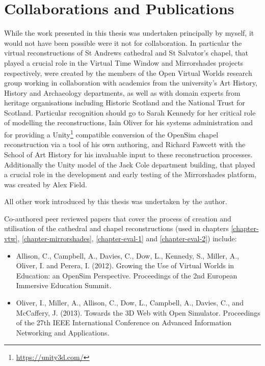 \section{Collaborations and Publications}
\label{collaborations-and-publications}
While the work presented in this thesis was undertaken principally by myself, it would not have been possible were it not for collaboration. In particular the virtual reconstructions of St Andrews cathedral and St Salvator's chapel, that played a crucial role in the Virtual Time Window and Mirrorshades projects respectively, were created by the members of the Open Virtual Worlds research group working in collaboration with academics from the university's Art History, History and Archaeology departments, as well as with domain experts from heritage organisations including Historic Scotland and the National Trust for Scotland. Particular recognition should go to Sarah Kennedy for her critical role of modelling the reconstructions, Iain Oliver for his systems administration and for providing a Unity\footnote{\url{https://unity3d.com/}} compatible conversion of the OpenSim chapel reconstruction via a tool of his own authoring, and Richard Fawcett with the School of Art History for his invaluable input to these reconstruction processes. Additionally the Unity model of the Jack Cole department building, that played a crucial role in the development and early testing of the Mirrorshades platform, was created by Alex Field.

All other work introduced by this thesis was undertaken by the author.


Co-authored peer reviewed papers that cover the process of creation and utilisation of the cathedral and chapel reconstructions (used in chapters \ref{chapter-vtw}, \ref{chapter-mirrorshades}, \ref{chapter-eval-1} and \ref{chapter-eval-2}) include:

\begin{itemize}

	\item [1.] Allison, C., Campbell, A., Davies, C., Dow, L., Kennedy, S., Miller, A., Oliver, I. and Perera, I. (2012). Growing the Use of Virtual Worlds in Education: an OpenSim Perspective. Proceedings of the 2nd European Immersive Education Summit.
	
	\item [2.] Oliver, I., Miller, A., Allison, C., Dow, L., Campbell, A., Davies, C., and McCaffery, J. (2013). Towards the 3D Web with Open Simulator. Proceedings of the 27th IEEE International Conference on Advanced Information Networking and Applications.

\end{itemize}

